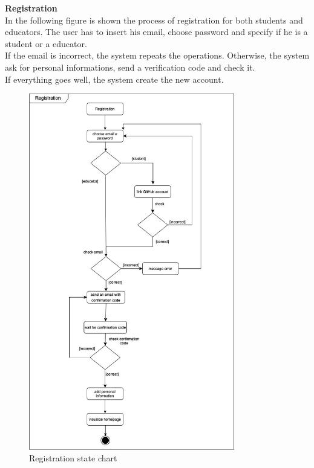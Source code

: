 \textbf{Registration}\\
In the following figure is shown the process of registration for both students and educators. 
The user has to insert his email, choose  password and specify if he is a student or a educator.\\
If the email is incorrect, the system repeats the operations. Otherwise, the system ask for personal informations,
 send a verification code and check it.\\If everything goes well, the system create the new account.
\begin{figure} [H]
  \centering
  \includegraphics[width=0.80\textwidth]{images/Registration.jpg}
  \caption{Registration state chart}
\end{figure} \vspace{1cm}

